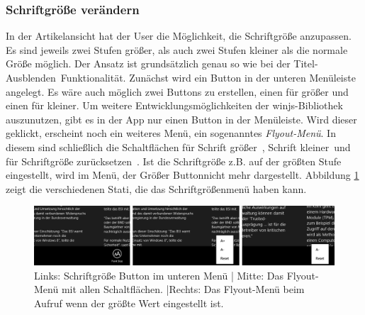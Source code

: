 \documentclass[12pt,a4paper,bibtotoc,abstracton]{scrartcl}
\begin{document}
\subsubsection{Schriftgröße verändern}
\label{subsubsec:schriftgroesseveraendern}
In der Artikelansicht hat der User die Möglichkeit, die Schriftgröße anzupassen. Es sind jeweils zwei Stufen größer, als auch zwei Stufen kleiner als die normale Größe möglich. Der  Ansatz ist grundsätzlich genau so wie bei der \glqq Titel-Ausblenden\grqq\ Funktionalität. Zunächst wird ein Button in der unteren Menüleiste angelegt. Es wäre auch möglich zwei Buttons zu erstellen, einen für größer und einen für kleiner. Um weitere  Entwicklungsmöglichkeiten der \ac{winjs}-Bibliothek auszunutzen, gibt es in der App nur einen Button in der Menüleiste. Wird dieser geklickt, erscheint noch ein weiteres Menü, ein sogenanntes \textit{Flyout-Menü}. In diesem sind schließlich die Schaltflächen für \glqq Schrift größer\grqq\ , \glqq Schrift kleiner\grqq\ und für \glqq Schriftgröße zurücksetzen\grqq\ . Ist die Schriftgröße z.B. auf der größten Stufe eingestellt, wird im Menü, der \glqq Größer Button\grqq nicht mehr dargestellt. Abbildung \ref{fig:fontsizemenü} zeigt die verschiedenen Stati, die das Schriftgrößenmenü haben kann.

\begin{figure}[h]
	\centering
	\includegraphics[width=\textwidth]{Bilder/Screenshots/app/font_size_menu_kompakt.png} 
	\caption[Die Schriftgröße-Buttons]{Links: Schriftgröße Button im unteren Menü | Mitte: Das Flyout-Menü mit allen Schaltflächen. |Rechts: Das Flyout-Menü beim Aufruf wenn der größte Wert eingestellt ist.}
	\label{fig:fontsizemenü}
\end{figure} 
\end{document}
